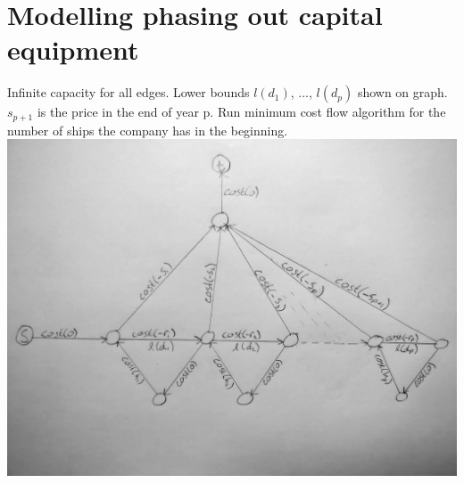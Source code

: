 \documentclass[a4paper]{article}
\begin{document}
\subsection{}

\section{Modelling phasing out capital equipment}
Infinite capacity for all edges. Lower bounds $l(d_1)$, ..., $l(d_p)$ shown on graph. $s_{p+1}$ is the price in the end of year p. Run minimum cost flow algorithm for the number of ships the company has in the beginning.\\
\includegraphics[width=\textwidth]{nr5graph}
\end{document}
